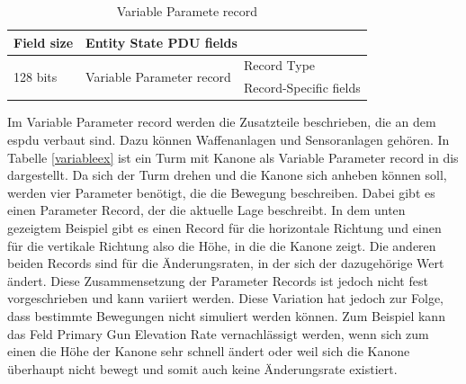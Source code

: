 \begin{table}[H]
	\centering
	\begin{tabular}{|l|l|l|}
		\hline
		Field size                & \multicolumn{2}{l|}{Entity State PDU fields}                        \\ \hline
		\multirow{2}{*}{128 bits} & \multirow{2}{*}{Variable Parameter record} & Record Type            \\ \cline{3-3} 
		&                                            & Record-Specific fields \\ \hline
	\end{tabular}
\caption[Variable Parameter record ]{Variable Paramete record\cite{SISOStandardsActivityCommitteeoftheIEEEComputerSociety.}}
\label{variable}
\end{table}
Im \glqq Variable Parameter record\grqq{} werden die Zusatzteile beschrieben, die an dem \ac{espdu} verbaut sind. Dazu können Waffenanlagen und Sensoranlagen gehören. In Tabelle \ref{variableex} ist ein Turm mit Kanone als  Variable Parameter record in \ac{dis} dargestellt. Da sich der Turm drehen und die Kanone sich anheben können soll, werden vier Parameter benötigt, die die Bewegung beschreiben. Dabei gibt es einen Parameter Record, der die aktuelle Lage beschreibt. In dem unten gezeigtem Beispiel gibt es einen  Record für die horizontale Richtung und einen für die vertikale Richtung also die Höhe, in die die Kanone zeigt. Die anderen beiden Records sind für die Änderungsraten, in der sich der dazugehörige Wert ändert. Diese Zusammensetzung der Parameter Records ist jedoch nicht fest vorgeschrieben und kann variiert werden. Diese Variation hat jedoch zur Folge, dass bestimmte Bewegungen nicht simuliert werden können. Zum Beispiel kann das Feld \glqq Primary Gun Elevation Rate\grqq{}  vernachlässigt werden, wenn sich zum einen die Höhe der Kanone sehr schnell ändert oder weil sich die Kanone überhaupt nicht bewegt und somit auch keine Änderungsrate existiert.  \\
\cite{SISOStandardsActivityCommitteeoftheIEEEComputerSociety.}
\cite{Shanks.}  
\cite{SISOStandardsActivityCommitteeoftheIEEEComputerSociety.6November2015}
\cite{MarkMcCall.} \cite{Wikipedia.}\cite{LucienZalcman.}
